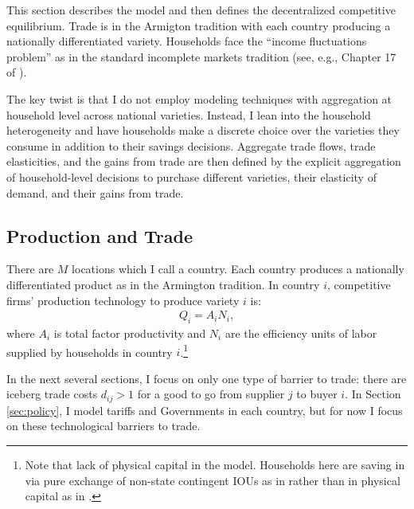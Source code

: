 \documentclass[12pt,pdftex]{article}
\begin{document}
\begin{onehalfspacing}
This section describes the model and then defines the decentralized competitive equilibrium. Trade is in the Armigton tradition with each country producing a nationally differentiated variety. Households face the ``income fluctuations problem'' as in the standard incomplete markets tradition (see, e.g., Chapter 17 of \citet{ljungqvist2012recursive}).

The key twist is that I do not employ modeling techniques with aggregation at household level across national varieties. Instead, I lean into the household heterogeneity and have households make a discrete choice over the varieties they consume in addition to their savings decisions. Aggregate trade flows, trade elasticities, and the gains from trade are then defined by the explicit aggregation of household-level decisions to purchase different varieties, their elasticity of demand, and their gains from trade.

\subsection{Production and Trade}\label{sec:trade}

There are $M$ locations which I call a country. Each country produces a nationally differentiated product as in the Armington tradition. In country $i$, competitive firms' production technology to produce variety $i$ is:
\begin{align}
Q_i = A_i N_i,
\label{eq:production}
\end{align}
where $A_i$ is total factor productivity and $N_i$ are the efficiency units of labor supplied by households in country $i$.\footnote{Note that lack of physical capital in the model. Households here are saving in via pure exchange of non-state contingent IOUs as in \citet{huggett1993risk} rather than in physical capital as in \citet{aiyagari1994uninsured}.}

In the next several sections, I focus on only one type of barrier to trade: there are iceberg trade costs $d_{ij} > 1$ for a good to go from supplier $j$ to buyer $i$. In Section \ref{sec:policy}, I model tariffs and Governments in each country, but for now I focus on these technological barriers to trade.


\end{onehalfspacing}
\end{document}
